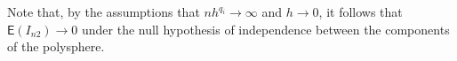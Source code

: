 \documentclass{article}
\begin{document}
Note that, by the assumptions that $nh^{q_i} \to \infty$ and $h \to 0$, it follows that $\mathsf{E} (I_{n2}) \to 0$ under the null hypothesis of independence between the components of the polysphere.






\end{document}
